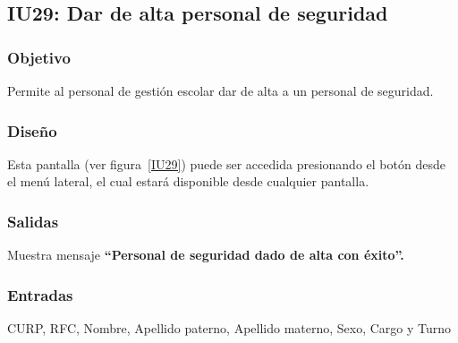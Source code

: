 
\subsection{IU29: Dar de alta personal de seguridad}
\subsubsection{Objetivo}
    Permite al personal de gestión escolar dar de alta a un personal de seguridad.
\subsubsection{Diseño}
    Esta pantalla  (ver figura~\ref{IU29}) puede ser accedida presionando el botón  desde el menú lateral, el cual estará disponible desde cualquier pantalla.

\subsubsection{Salidas}
Muestra mensaje {\bf ``Personal de seguridad dado de alta con éxito''.}
\subsubsection{Entradas}
CURP, RFC, Nombre, Apellido paterno, Apellido materno, Sexo, Cargo y Turno
